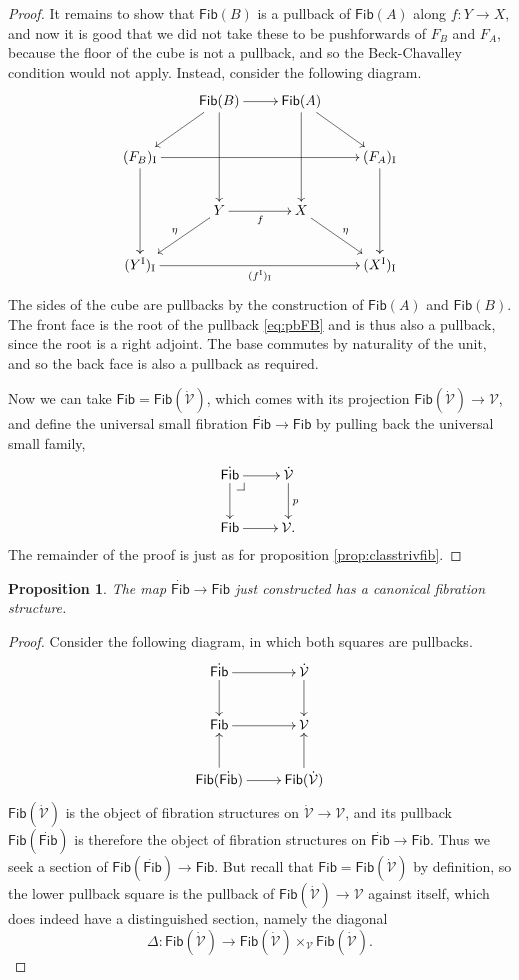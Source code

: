 \documentclass[11pt]{article}
\makeatletter
\newcommand{\pbcorner}[1][dr]{\save*!/#1-1.2pc/#1:(-1,1)@^{|-}\restore}
\newcommand{\ra}{\ensuremath{\rightarrow}}
\newcommand{\I}{\ensuremath{\mathrm{I}}}
\newcommand{\V}{\ensuremath{\mathcal{V}}}
\newcommand{\VV}{\ensuremath{\dot{\mathcal{V}}}}
\newcommand{\Fib}{\ensuremath{\mathsf{Fib}}}
\newcommand{\FFib}{\ensuremath{\dot{\mathsf{Fib}}}}
\newtheorem{proposition}[theorem]{Proposition}
\theoremstyle{remark}
\theoremstyle{definition}
\makeatother
\begin{document}
\begin{proof}
It remains to show that $\Fib(B)$ is a pullback of $\Fib(A)$ along $f:Y\ra X$, and now it is good that we did not take these to be pushforwards of $F_B$ and $F_A$, because the floor of the cube is not a pullback, and so the Beck-Chavalley condition would not apply.  Instead, consider the following diagram.
\begin{equation}\label{diagram:fibU10}
\xymatrix{
& \Fib(B) \ar[ld] \ar[dd]  \ar[r] & \Fib(A) \ar[dd] \ar[rd] & \\
(F_B)_\I \ar[dd] \ar[rrr] &&& (F_A)_\I \ar[dd] \\
& Y \ar[ld]_\eta \ar[r]_f & X \ar[rd]^\eta &\\
(Y^\I)_\I \ar[rrr]_{(f^\I)_\I} &&& (X^\I)_\I 
 }
\end{equation}
The sides of the cube are pullbacks by the construction of $\Fib(A)$ and $\Fib(B)$. The front face is the root of the pullback \eqref{eq:pbFB} and is thus also a pullback, since the root is a right adjoint. The base commutes by naturality of the unit, and so the back face is also a pullback as required.


Now we can take $\Fib = \Fib(\VV)$, which comes with its projection $\Fib(\VV) \ra \V$, and define the universal small fibration $\FFib\ra\Fib$ by pulling back the universal small family,
\[
\xymatrix{
\FFib \ar[d] \ar[r]  \pbcorner & \VV\ar[d]^p\\
\Fib \ar[r] & \V.
}
\]
The remainder of the proof is just as for proposition \ref{prop:classtrivfib}.
\end{proof}

\begin{proposition}
The map $\FFib\ra\Fib$ just constructed has a canonical fibration structure.
\end{proposition}
\begin{proof}
Consider the following diagram, in which both squares are pullbacks.
\begin{equation}\label{diagram:fibisfib}
\xymatrix{
\FFib \ar[d] \ar[r]  & \VV \ar[d]\\
\Fib \ar[r] & \V\\
\Fib(\FFib) \ar[u] \ar[r] & \Fib(\VV)\ar[u].
}
\end{equation}
$\Fib(\VV)$ is the object of fibration structures on $\VV\ra\V$, and its pullback $\Fib(\FFib)$ is therefore the object of fibration structures on $\FFib\ra\Fib$.  Thus we seek a section of $\Fib(\FFib) \ra \Fib$.  But recall that $\Fib = \Fib(\VV)$ by definition, so the lower pullback square is the pullback of $\Fib(\VV)\ra \V$ against itself, which does indeed have a distinguished section, namely the diagonal
\[
\Delta : \Fib(\VV) \to \Fib(\VV)\times_\V\Fib(\VV).
\]
\end{proof}
\end{document}
